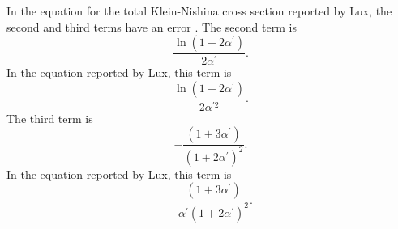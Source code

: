 In the equation for the total Klein-Nishina cross section reported by Lux, the
second and third terms have an error \citep{lux_monte_1991}. The second term is
\begin{equation*}
  \frac{\ln{(1 + 2\alpha^{'})}}{2\alpha^{'}}.
\end{equation*}
In the equation reported by Lux, this term is
\begin{equation*}
  \frac{\ln{(1 + 2\alpha^{'})}}{2\alpha^{'2}}.
\end{equation*}
The third term is 
\begin{equation*}
  -\frac{(1+3\alpha^{'})}{(1+2\alpha^{'})^2}.
\end{equation*}
In the equation reported by Lux, this term is
\begin{equation*}
  -\frac{(1+3\alpha^{'})}{\alpha^{'}(1+2\alpha^{'})^2}.
\end{equation*}
